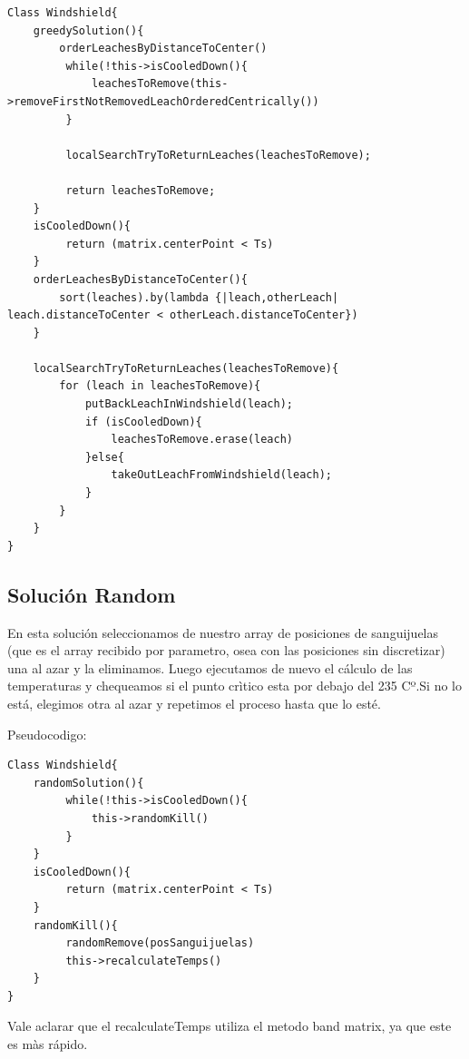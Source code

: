 \begin{verbatim}
Class Windshield{
    greedySolution(){
        orderLeachesByDistanceToCenter()
         while(!this->isCooledDown(){
             leachesToRemove(this->removeFirstNotRemovedLeachOrderedCentrically())
         }

         localSearchTryToReturnLeaches(leachesToRemove);

         return leachesToRemove;
    } 
    isCooledDown(){
         return (matrix.centerPoint < Ts)
    }
    orderLeachesByDistanceToCenter(){
        sort(leaches).by(lambda {|leach,otherLeach| leach.distanceToCenter < otherLeach.distanceToCenter})
    }

    localSearchTryToReturnLeaches(leachesToRemove){
        for (leach in leachesToRemove){
            putBackLeachInWindshield(leach);
            if (isCooledDown){
                leachesToRemove.erase(leach)
            }else{
                takeOutLeachFromWindshield(leach);
            }
        }
    }
}
\end{verbatim}



\subsection{Solución Random}\label{sec:solucionRandom}


En esta solución seleccionamos de nuestro array de posiciones de sanguijuelas (que es el array recibido por parametro, osea con las posiciones sin discretizar) una al azar y la eliminamos. Luego ejecutamos de nuevo el cálculo de las temperaturas y chequeamos si el punto crìtico esta por debajo del 235 Cº.Si no lo está, elegimos otra al azar y repetimos el proceso hasta que lo esté. 

Pseudocodigo:

\begin{verbatim}
Class Windshield{
    randomSolution(){
         while(!this->isCooledDown(){
             this->randomKill()
         }
    } 
    isCooledDown(){
         return (matrix.centerPoint < Ts)
    }
    randomKill(){
         randomRemove(posSanguijuelas)
         this->recalculateTemps()
    }
}
\end{verbatim}

Vale aclarar que el recalculateTemps utiliza el metodo band matrix, ya que este es màs rápido.










